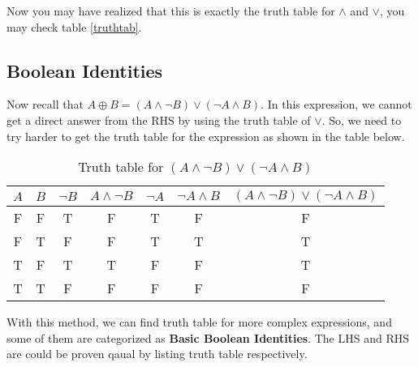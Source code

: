        Now you may have realized that this is exactly the truth table for $\land$ and $\lor$, you may
        check table \ref{truthtab}.
    
        \subsection{Boolean Identities}
        Now recall that $A \oplus B= (A \land \lnot B) \lor(\lnot A \land B)$. In this
        expression, we cannot get a direct answer from the RHS by using the truth table of $\lor$. So,
        we need to try harder to get the truth table for the expression as shown in the table below.
        \begin{table}[ht]
            \centering
            \caption{Truth table for \((A \land \neg B) \lor (\neg A \land B)\)}
            \begin{tabular}{cc|c|c|c|c|c}
            \hline
            \( A \) & \( B \) & \( \neg B \) & \( A \land \neg B \) & \( \neg A \) & \( \neg A \land B \) & \( (A \land \neg B) \lor (\neg A \land B) \) \\ \hline
            F & F & T & F & T & F & F \\
            F & T & F & F & T & T & T \\
            T & F & T & T & F & F & T \\
            T & T & F & F & F & F & F \\ \hline
            \end{tabular}
            
        \end{table}

        With this method, we can find truth table for more complex expressions, and some of them
        are categorized as \textbf{Basic Boolean Identities}. The LHS and RHS are could be proven qaual
        by listing truth table respectively.

